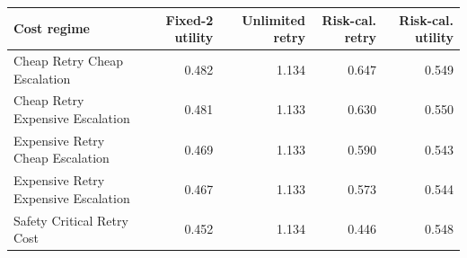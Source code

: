 \begin{tabular}{lrrrr}
\toprule
Cost regime & Fixed-2 utility & Unlimited retry & Risk-cal. retry & Risk-cal. utility \\
\midrule
Cheap Retry Cheap Escalation & 0.482 & 1.134 & 0.647 & 0.549 \\
Cheap Retry Expensive Escalation & 0.481 & 1.133 & 0.630 & 0.550 \\
Expensive Retry Cheap Escalation & 0.469 & 1.133 & 0.590 & 0.543 \\
Expensive Retry Expensive Escalation & 0.467 & 1.133 & 0.573 & 0.544 \\
Safety Critical Retry Cost & 0.452 & 1.134 & 0.446 & 0.548 \\
\bottomrule
\end{tabular}
